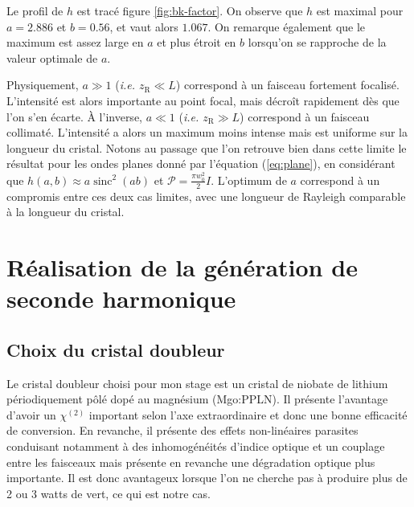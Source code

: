 \documentclass[11pt,a4paper] { article}
\edef\hc{\string:}\newcommand{\dv}[2]{\frac{\mathrm d #1}{\mathrm d #2}}
\newcommand{\zr}{z_\mathsc{R}}
\newcommand{\chie}{\chi_\mathsc{eff}}
\DeclareMathOperator{\sinc}{sinc}
\renewcommand{\P}{\mathscr{P}}
\newcommand{\mathsc}[1]{\mathrm{\scriptscriptstyle {#1}}}
\begin{document}
Le profil de $h$ est tracé figure \ref{fig:bk-factor}. On observe que $h$ est maximal pour $a=2.886$ et $b=0.56$, et vaut alors $1.067$. On remarque également que le maximum est assez large en $a$ et plus étroit en $b$ lorsqu'on se rapproche de la valeur optimale de $a$.

Physiquement, $a\gg1$ (\textit{i.e. $\zr \ll L$}) correspond à un faisceau fortement focalisé. L'intensité est alors importante au point focal, mais décroît rapidement dès que l'on s'en écarte. À l'inverse, $a\ll1$ (\textit{i.e. $\zr \gg L$}) correspond à un faisceau collimaté. L'intensité a alors un maximum moins intense mais est uniforme sur la longueur du cristal. Notons au passage que l'on retrouve bien dans cette limite le résultat pour les ondes planes donné par l'équation (\ref{eq:plane}), en considérant que $h(a,b) \approx a \sinc^2(ab)$ et $\P = \frac{\pi w_0^2}{2} I$.
L'optimum de $a$ correspond à un compromis entre ces deux cas limites, avec une longueur de Rayleigh comparable à la longueur du cristal.



\section{Réalisation de la génération de seconde harmonique} 

\subsection{Choix du cristal doubleur}

Le cristal doubleur choisi pour mon stage est un cristal de niobate de lithium périodiquement pôlé dopé au magnésium (Mgo\hc PPLN). Il présente l'avantage d'avoir un $\chi^{(2)}$ important selon l'axe extraordinaire et donc une bonne efficacité de conversion. En revanche, il présente des effets non-linéaires parasites conduisant notamment à des inhomogénéités d'indice optique et un couplage entre les faisceaux mais présente en revanche une dégradation optique plus importante. Il est donc avantageux lorsque l'on ne cherche pas à produire plus de 2 ou 3 watts de vert, ce qui est notre cas. %
\end{document}
